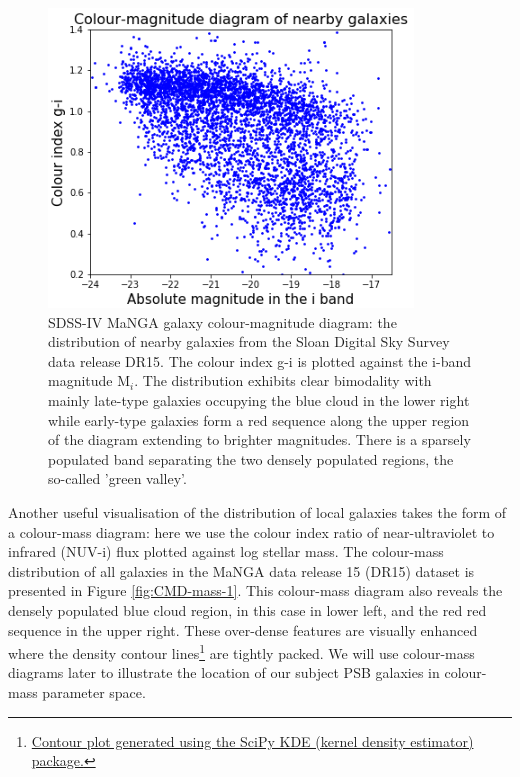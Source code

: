 \begin{figure}
    \centering
    \includegraphics[width=\columnwidth]{images/CMDs/CMD-G_i-i.png}
    \caption[SDSS-IV MaNGA galaxy colour-magnitude diagram]{SDSS-IV MaNGA galaxy colour-magnitude diagram: the distribution of nearby galaxies from the Sloan Digital Sky Survey data release DR15. The colour index g-i is plotted against the i-band magnitude M$_i$. The distribution exhibits clear bimodality with mainly late-type galaxies occupying the blue cloud in the lower right while early-type galaxies form a red sequence along the upper region of the diagram extending to brighter magnitudes. There is a sparsely populated band separating the two densely populated regions, the so-called 'green valley'.}
    \label{fig:CMD-G_i-i}
\end{figure}

Another useful visualisation of the distribution of local galaxies takes the form of a colour-mass diagram: here we use the colour index ratio of near-ultraviolet to infrared (NUV-i) flux plotted against log stellar mass. The colour-mass distribution of all galaxies in the MaNGA data release 15 (DR15) dataset is presented in Figure \ref{fig:CMD-mass-1}. This colour-mass diagram also reveals the densely populated blue cloud region, in this case in lower left, and the red red sequence in the upper right. These over-dense features are visually enhanced where the density contour lines\footnote{\href{https://seaborn.pydata.org/generated/seaborn.kdeplot.html}{Contour plot generated using the SciPy KDE (kernel density estimator) package.}} are tightly packed. We will use colour-mass diagrams later to illustrate the location of our subject PSB galaxies in colour-mass parameter space.

